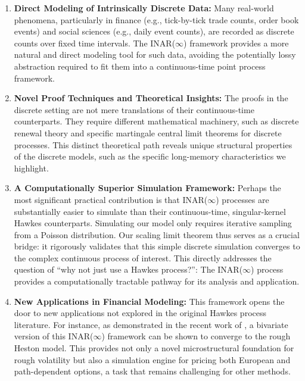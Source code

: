 \documentclass[letterpaper]{article}
\numberwithin{equation}{section}
\theoremstyle{definition}
\theoremstyle{remark}
\begin{document}
\begin{enumerate}
    \item \textbf{Direct Modeling of Intrinsically Discrete Data:} Many real-world phenomena, particularly in finance (e.g., tick-by-tick trade counts, order book events) and social sciences (e.g., daily event counts), are recorded as discrete counts over fixed time intervals. The INAR($\infty$) framework provides a more natural and direct modeling tool for such data, avoiding the potentially lossy abstraction required to fit them into a continuous-time point process framework.

    \item \textbf{Novel Proof Techniques and Theoretical Insights:} The proofs in the discrete setting are not mere translations of their continuous-time counterparts. They require different mathematical machinery, such as discrete renewal theory and specific martingale central limit theorems for discrete processes. This distinct theoretical path reveals unique structural properties of the discrete models, such as the specific long-memory characteristics we highlight.

    \item \textbf{A Computationally Superior Simulation Framework:} Perhaps the most significant practical contribution is that INAR($\infty$) processes are substantially easier to simulate than their continuous-time, singular-kernel Hawkes counterparts. Simulating our model only requires iterative sampling from a Poisson distribution. Our scaling limit theorem thus serves as a crucial bridge: it rigorously validates that this simple discrete simulation converges to the complex continuous process of interest. This directly addresses the question of ``why not just use a Hawkes process?'': The INAR($\infty$) process provides a computationally tractable pathway for its analysis and application.

    \item \textbf{New Applications in Financial Modeling:} This framework opens the door to new applications not explored in the original Hawkes process literature. For instance, as demonstrated in the recent work of \cite{wang2025rough}, a bivariate version of this INAR($\infty$) framework can be shown to converge to the rough Heston model. This provides not only a novel microstructural foundation for rough volatility but also a simulation engine for pricing both European and path-dependent options, a task that remains challenging for other methods.
\end{enumerate}
\end{document}
